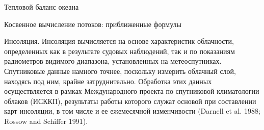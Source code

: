 \begin{chapter}{Тепловой баланс океана}
\begin{section}{Косвенное вычисление потоков: приближенные формулы}
\begin{paragraph}{Инсоляция.}
Инсоляция вычисляется на основе характеристик облачности, определенных как в
результате судовых наблюдений, так и по показаниям радиометров видимого 
диапазона, установленных на метеоспутниках. Спутниковые данные намного точнее,
поскольку измерить облачный слой, находясь под ним, крайне затруднительно.
Обработка этих данных осуществляется в рамках Международного проекта 
по спутниковой климатологии облаков (ИСККП), результаты работы которого
служат основой при составлении карт инсоляции, в том числе и ее ежемесячной 
изменчивости (Darnell et al. 1988; Rossow and Schiffer 1991).
%


\end{paragraph}
\end{section}
\end{chapter}
